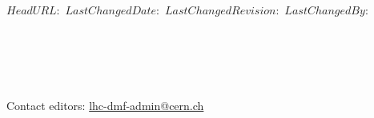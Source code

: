 \svnidlong
{$HeadURL: $}
{$LastChangedDate: $}
{$LastChangedRevision: $}
{$LastChangedBy: $}


\thispagestyle{empty}%
\begin{fullwidth}
\sffamily
{
  \Large
  \fontsize{18}{24}\selectfont 
  \@title
}\\
\vspace{1\baselineskip}
{\Large 
\noindent
\@date\\
\vspace{2\baselineskip}
\noindent

~\\
\noindent Contact editors: \href{mailto:lhc-dmf-admin@cern.ch}{lhc-dmf-admin@cern.ch}
}\\
\end{fullwidth}
\vspace*{\fill}

